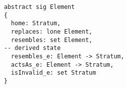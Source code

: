 \lstset{frame=tb, aboveskip=12pt, belowskip=-3pt, breaklines=true, basicstyle=\small\ttfamily, tabsize=2, mathescape=true}
\begin{lstlisting}[caption={base\_structure.als, lines 61-73}, label=alloy:element, captionpos=b]
abstract sig Element
{
  home: Stratum,
  replaces: lone Element,
  resembles: set Element,
-- derived state
  resembles_e: Element -> Stratum,
  actsAs_e: Element -> Stratum,
  isInvalid_e: set Stratum
}
\end{lstlisting}

